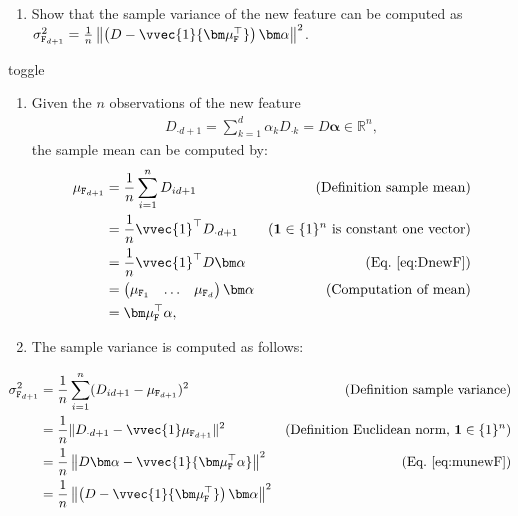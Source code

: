 \documentclass[letterpaper,10pt,english]{jupyterBook}
\begin{document}
\begin{enumerate}
\begin{enumerate}
\item {} 
\sphinxAtStartPar
Show that the sample variance of the new feature can be computed as \(\sigma_{\mathtt{F}_{d+1}}^2 = \frac1n\left\lVert \left(D -\vvec{1}{\bm \mu_\mathtt{F}^\top }\right){\bm\alpha}\right\rVert^2\).

\end{enumerate}

\begin{sphinxuseclass}{toggle}\begin{enumerate}
%
\item {} 
\sphinxAtStartPar
Given the \(n\) observations of the new feature
\label{equation:dim_reduction_exercises:39d80888-cea0-4686-9642-184ffc57d095}\begin{align}
    D_{\cdot d+1} =\sum_{k=1}^d \alpha_kD_{\cdot k}=D\bm\alpha\in\mathbb{R}^n, \label{eq:DnewF}
    \end{align}
\sphinxAtStartPar
the sample mean can be computed by:
\label{equation:dim_reduction_exercises:e904e465-5bc5-40fa-b10b-536b12457859}\begin{align}
    \mu_{\mathtt{F}_{d+1}} &= \frac1n \sum_{i=1}^n D_{i d+1} &\text{(Definition sample mean)}\nonumber\\
    &= \frac1n\vvec{1}^\top D_{\cdot d+1} & (\mathbf{1}\in\{1\}^n \text{ is constant one vector})\nonumber\\
    &= \frac1n\vvec{1}^\top D{\bm\alpha} & \text{(Eq.~\eqref{eq:DnewF})}\nonumber\\
    &= \begin{pmatrix}
    \mu_{\mathtt{F}_1} &\ldots & \mu_{\mathtt{F}_d}
    \end{pmatrix} {\bm\alpha} &\text{(Computation of mean)}\nonumber\\
    &= {\bm \mu_\mathtt{F}^\top \alpha},\label{eq:munewF}
    \end{align}
\item {} 
\sphinxAtStartPar
The sample variance is computed as follows:

\end{enumerate}
\begin{align*}
    \sigma_{\mathtt{F}_{d+1}}^2 &=\frac1n\sum_{i=1}^n (D_{id+1}-\mu_{\mathtt{F}_{d+1}})^2 &\text{(Definition sample variance)}\\
    &=\frac1n\Vert D_{\cdot d+1} - \vvec{1}\mu_{\mathtt{F}_{d+1}}\rVert^2 & (\text{Definition Euclidean norm, }\mathbf{1}\in\{1\}^n)\\
    &=\frac1n\left\lVert D{\bm\alpha} -\vvec{1}{\bm \mu_\mathtt{F}^\top \alpha}\right\rVert^2 & (\text{Eq.~\eqref{eq:munewF}})\\
    &=\frac1n\left\lVert \left(D -\vvec{1}{\bm \mu_\mathtt{F}^\top }\right){\bm\alpha}\right\rVert^2
\end{align*}
\end{sphinxuseclass}
\end{enumerate}
\end{document}
